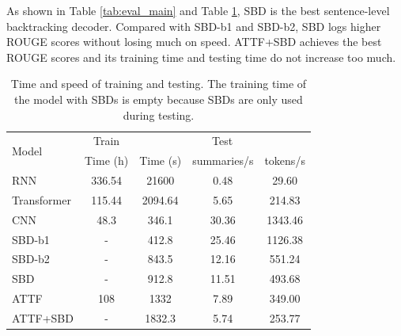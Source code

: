\documentclass{nle}
\theoremstyle{definition}
\newcommand{\tabref}[1]{Table \ref{#1}}
\begin{document}
As shown in \tabref{tab:eval_main} and \tabref{tab:eval_speed}, 
SBD is the best sentence-level backtracking decoder.
Compared with SBD-b1 and SBD-b2,
SBD logs higher ROUGE scores without losing much on speed. 
ATTF+SBD achieves the best ROUGE scores 
and its training time and testing time do not increase too much.

\begin{table}[th!]
	\centering
	\caption{Time and speed of training and testing. The training time of the model with SBDs
		is empty because SBDs are only used during testing.}
	\begin{tabular}{|l|c|c|c|c|}
		\hline
		\multirow{2}{*}{Model} & Train & \multicolumn{3}{|c|}{Test} \\
		\cline{2-5}
		& Time (h) & Time (s) & summaries/s & tokens/s \\
		\hline
		RNN  & 336.54 &21600 & 0.48 & 29.60 \\
		Transformer & 115.44 & 2094.64 & 5.65 & 214.83 \\
		\hline
		CNN & 48.3 &346.1 & 30.36 & 1343.46 \\
		SBD-b1 & - & 412.8 & 25.46 & 1126.38 \\
		SBD-b2 & -  &843.5 &12.16 & 551.24 \\
		SBD & - &912.8 & 11.51 & 493.68 \\
		ATTF & 108 &1332 & 7.89 &  349.00 \\
		ATTF+SBD & - &1832.3 & 5.74 &  253.77 \\
		\hline
	\end{tabular}
	\label{tab:eval_speed}
\end{table}
\end{document}
